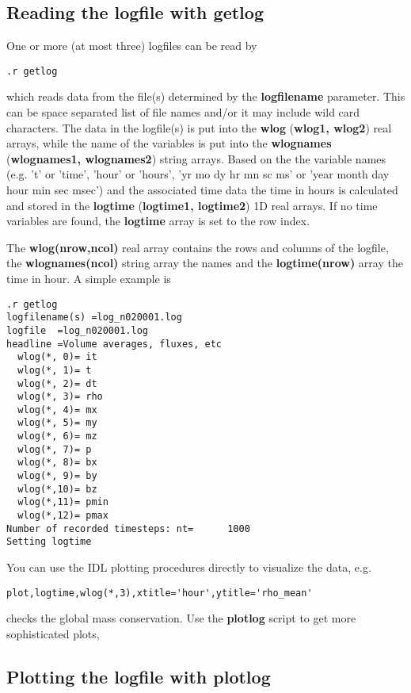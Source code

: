 \subsection{Reading the logfile with getlog \label{s-getlog}}

One or more (at most three) logfiles can be read by
\begin{verbatim}
.r getlog
\end{verbatim}
   which reads data from the file(s) determined by the {\bf logfilename} 
   parameter. This can be space separated list of file names and/or it
   may include wild card characters. The data in the
   logfile(s) is put into the {\bf wlog} ({\bf wlog1, wlog2}) real arrays,
   while the name of the variables is put into the {\bf wlognames} 
   ({\bf wlognames1, wlognames2}) string arrays. Based on the
   the variable names (e.g. 't' or 'time', 'hour' or 'hours',
   'yr mo dy hr mn sc ms' or 'year month day hour min sec msec') 
   and the associated time data the time in hours is calculated 
   and stored in the {\bf logtime} ({\bf logtime1, logtime2}) 1D real arrays. 
   If no time variables are found, the {\bf logtime} array is set to the
   row index.

   The {\bf wlog(nrow,ncol)} real array contains the rows and columns of the
   logfile, the {\bf wlognames(ncol)} string array the names and the
   {\bf logtime(nrow)} array the time in hour. A simple example is 
\begin{verbatim}
.r getlog
logfilename(s) =log_n020001.log
logfile  =log_n020001.log
headline =Volume averages, fluxes, etc
  wlog(*, 0)= it
  wlog(*, 1)= t
  wlog(*, 2)= dt
  wlog(*, 3)= rho
  wlog(*, 4)= mx
  wlog(*, 5)= my
  wlog(*, 6)= mz
  wlog(*, 7)= p
  wlog(*, 8)= bx
  wlog(*, 9)= by
  wlog(*,10)= bz
  wlog(*,11)= pmin
  wlog(*,12)= pmax
Number of recorded timesteps: nt=      1000
Setting logtime
\end{verbatim}
You can use the IDL plotting procedures directly to visualize the data, e.g.
\begin{verbatim}
plot,logtime,wlog(*,3),xtitle='hour',ytitle='rho_mean'
\end{verbatim}
checks the global mass conservation. 
Use the {\bf plotlog} script to get more sophisticated plots,

\subsection{Plotting the logfile with plotlog \label{s-plotlog}}

